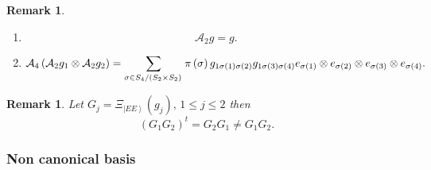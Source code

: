 \documentclass[aps,preprint]{revtex4}%
\newtheorem{remark}[theorem]{Remark}
\begin{document}
\begin{remark}
\begin{enumerate}
\item
\begin{equation}
\mathcal{A}_{2}g=g.
\end{equation}


\item
\begin{equation}
\mathcal{A}_{4}\left(  \mathcal{A}_{2}g_{1}\otimes\mathcal{A}_{2}g_{2}\right)
=\sum_{\sigma\in S_{4}\left/  \left(  S_{2}\times S_{2}\right)  \right.  }%
\pi\left(  \sigma\right)  g_{1\sigma\left(  1\right)  \sigma\left(  2\right)
}g_{1\sigma\left(  3\right)  \sigma\left(  4\right)  }e_{\sigma\left(
1\right)  }\otimes e_{\sigma\left(  2\right)  }\otimes e_{\sigma\left(
3\right)  }\otimes e_{\sigma\left(  4\right)  }.
\end{equation}

\end{enumerate}
\end{remark}

\begin{remark}
Let $G_{j}=\Xi_{\left\vert EE\right\rangle }\left(  g_{j}\right)  ,\,1\leq
j\leq2$ then
\begin{equation}
\left(  G_{1}G_{2}\right)  ^{t}=G_{2}G_{1}\neq G_{1}G_{2}.
\end{equation}

\end{remark}

\subsubsection{Non canonical basis}
\end{document}
